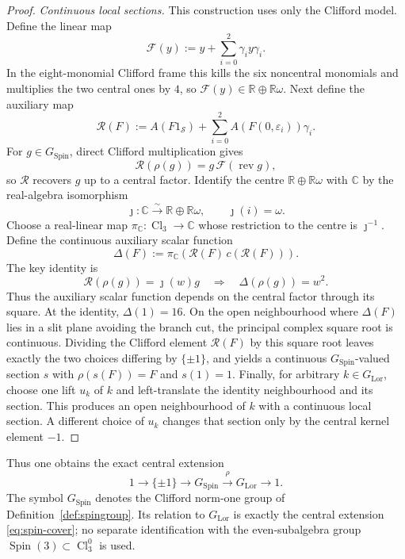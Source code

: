\documentclass[11pt,a4paper]{article}
\theoremstyle{definition}
\theoremstyle{remark}
\newcommand{\R}{\mathbb{R}}
\newcommand{\Smodel}{\mathcal{S}}
\newcommand{\Cl}{\operatorname{Cl}}
\newcommand{\SpinG}{G_{\mathrm{Spin}}}
\newcommand{\LorG}{G_{\mathrm{Lor}}}
\begin{document}
\begin{proof}
\emph{Continuous local sections.}  This construction uses only the Clifford model.  Define the linear map
\[
   \mathcal F(y)
   :=y+\sum_{i=0}^{2}\gamma_i y\gamma_i .
\]
In the eight-monomial Clifford frame this kills the six noncentral
monomials and multiplies the two central ones by \(4\), so
\(\mathcal F(y)\in\R\oplus\R\omega\).  Next define the auxiliary map
\[
   \mathcal R(F)
   :=A(F1_{\Smodel})
     +\sum_{i=0}^{2}A\!\left(F(0,\varepsilon_i)\right)\gamma_i .
\]
For \(g\in\SpinG\), direct Clifford multiplication gives
\[
   \mathcal R(\rho(g))
   =g\,\mathcal F(\operatorname{rev}g),
\]
so \(\mathcal R\) recovers \(g\) up to a central factor.  Identify the centre \(\R\oplus\R\omega\) with \(\mathbb C\) by the
real-algebra isomorphism
\[
   \jmath:\mathbb C\xrightarrow{\sim}\R\oplus\R\omega,
   \qquad \jmath(i)=\omega.
\]
Choose a real-linear map \(\pi_{\mathbb C}:\Cl_3\to\mathbb C\) whose
restriction to the centre is \(\jmath^{-1}\).  Define the continuous auxiliary scalar function
\[
   \Delta(F)
   :=\pi_{\mathbb C}\!\left(
      \mathcal R(F)\,c(\mathcal R(F))
   \right).
\]
The key identity is
\[
   \mathcal R(\rho(g))=\jmath(w)g
   \quad\Longrightarrow\quad
   \Delta(\rho(g))=w^2.
\]
Thus the auxiliary scalar function depends on the central factor through its square.  At the identity,
\(\Delta(1)=16\).  On the open neighbourhood where \(\Delta(F)\) lies in
a slit plane avoiding the branch cut, the principal complex square root is
continuous.  Dividing the Clifford element \(\mathcal R(F)\) by this square root
leaves exactly the two choices differing by \(\{\pm1\}\), and yields a
continuous \(\SpinG\)-valued section \(s\) with \(\rho(s(F))=F\) and \(s(1)=1\).
Finally, for arbitrary \(k\in\LorG\), choose one lift \(u_k\) of \(k\) and
left-translate the identity neighbourhood and its section.  This produces
an open neighbourhood of \(k\) with a continuous local section.  A
different choice of \(u_k\) changes that section only by the central
kernel element \(-1\).
\end{proof}

Thus one obtains the exact central extension
\[
   1\longrightarrow\{\pm1\}
   \longrightarrow\SpinG
   \overset{\rho}{\longrightarrow}\LorG
   \longrightarrow1.
\tag{3.11}\label{eq:spin-cover}
\]
The symbol \(\SpinG\) denotes the Clifford norm-one group of
Definition~\ref{def:spingroup}.  Its relation to \(\LorG\) is exactly the
central extension \eqref{eq:spin-cover}; no separate identification with the
even-subalgebra group \(\operatorname{Spin}(3)\subset\Cl_3^0\) is used.
\end{document}
